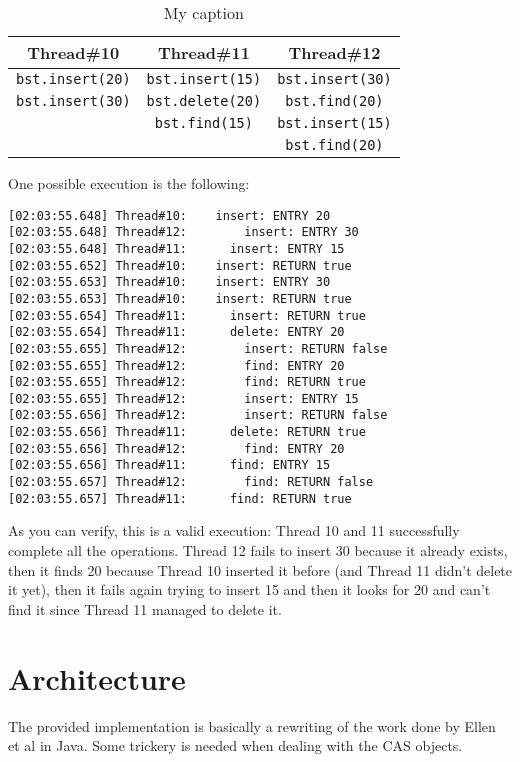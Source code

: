 \documentclass[a4paper,draft,12pt]{article}
\begin{document}
\begin{table}[H]
\centering

\label{my-label}
\begin{tabular}{c|c|c}
{\bf Thread\#10} & {\bf Thread\#11} & {\bf Thread\#12} \\
\hline
\texttt{bst.insert(20)}   & \texttt{bst.insert(15)}   & \texttt{bst.insert(30)}   \\
\texttt{bst.insert(30)}   & \texttt{bst.delete(20)}   & \texttt{bst.find(20)}     \\
                 & \texttt{bst.find(15)}     & \texttt{bst.insert(15)}   \\
                 &                  & \texttt{bst.find(20)}
\end{tabular}
\caption{My caption}
\end{table}

One possible execution is the following:
\begin{verbatim}
[02:03:55.648] Thread#10:    insert: ENTRY 20
[02:03:55.648] Thread#12:        insert: ENTRY 30
[02:03:55.648] Thread#11:      insert: ENTRY 15
[02:03:55.652] Thread#10:    insert: RETURN true
[02:03:55.653] Thread#10:    insert: ENTRY 30
[02:03:55.653] Thread#10:    insert: RETURN true
[02:03:55.654] Thread#11:      insert: RETURN true
[02:03:55.654] Thread#11:      delete: ENTRY 20
[02:03:55.655] Thread#12:        insert: RETURN false
[02:03:55.655] Thread#12:        find: ENTRY 20
[02:03:55.655] Thread#12:        find: RETURN true
[02:03:55.655] Thread#12:        insert: ENTRY 15
[02:03:55.656] Thread#12:        insert: RETURN false
[02:03:55.656] Thread#11:      delete: RETURN true
[02:03:55.656] Thread#12:        find: ENTRY 20
[02:03:55.656] Thread#11:      find: ENTRY 15
[02:03:55.657] Thread#12:        find: RETURN false
[02:03:55.657] Thread#11:      find: RETURN true
\end{verbatim}

As you can verify, this is a valid execution: Thread 10 and 11 successfully complete all the operations. Thread 12 fails to insert 30 because it already exists, then it finds 20 because Thread 10 inserted it before (and Thread 11 didn't delete it yet), then it fails again trying to insert 15 and then it looks for 20 and can't find it since Thread 11 managed to delete it.


\section{Architecture} %
\label{sec:architecture}
The provided implementation is basically a rewriting of the work done by Ellen et al in Java. Some trickery is needed when dealing with the \ac{CAS} objects.
\end{document}

